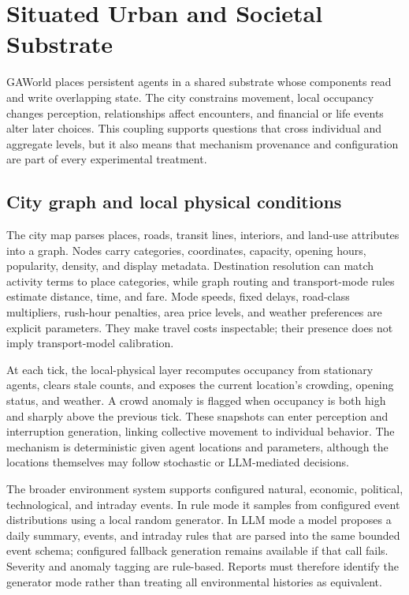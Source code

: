 \section{Situated Urban and Societal Substrate}
\label{sec:societal-substrate}

GAWorld places persistent agents in a shared substrate whose components read
and write overlapping state.  The city constrains movement, local occupancy
changes perception, relationships affect encounters, and financial or life
events alter later choices.  This coupling supports questions that cross
individual and aggregate levels, but it also means that mechanism provenance
and configuration are part of every experimental treatment.

\subsection{City graph and local physical conditions}

The city map parses places, roads, transit lines, interiors, and land-use
attributes into a graph.  Nodes carry categories, coordinates, capacity,
opening hours, popularity, density, and display metadata.  Destination
resolution can match activity terms to place categories, while graph routing
and transport-mode rules estimate distance, time, and fare.  Mode speeds,
fixed delays, road-class multipliers, rush-hour penalties, area price levels,
and weather preferences are explicit parameters.  They make travel costs
inspectable; their presence does not imply transport-model calibration.

At each tick, the local-physical layer recomputes occupancy from stationary
agents, clears stale counts, and exposes the current location's crowding,
opening status, and weather.  A crowd anomaly is flagged when occupancy is both
high and sharply above the previous tick.  These snapshots can enter
perception and interruption generation, linking collective movement to
individual behavior.  The mechanism is deterministic given agent locations
and parameters, although the locations themselves may follow stochastic or
LLM-mediated decisions.

The broader environment system supports configured natural, economic,
political, technological, and intraday events.  In rule mode it samples from
configured event distributions using a local random generator.  In LLM mode a
model proposes a daily summary, events, and intraday rules that are parsed into
the same bounded event schema; configured fallback generation remains
available if that call fails.  Severity and anomaly tagging are rule-based.
Reports must therefore identify the generator mode rather than treating all
environmental histories as equivalent.

